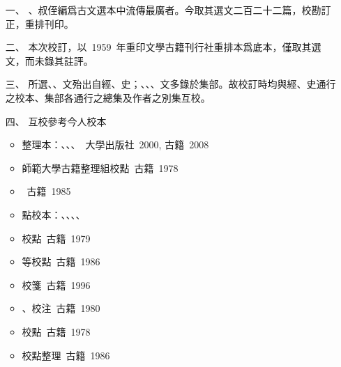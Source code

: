 \begin{enumerate}
    \item[一、] 、叔侄編爲古文選本中流傳最廣者。今取其選文二百二十二篇，校勘訂正，重排刊印。
    \item[二、] 本次校訂，以\ 1959\ 年重印文學古籍刊行社重排本爲底本，僅取其選文，而未錄其註評。
    \item[三、] 所選、、文殆出自經、史；、、、文多錄於集部。故校訂時均與經、史通行之校本、集部各通行之總集及作者之別集互校。
    \item[四、] 互校參考今人校本
    \begin{itemize}
        \item {}整理本：、、、\ {\small {}大學出版社\ 2000, 古籍\ 2008}
        \item {}師範大學古籍整理組校點\ {\small {}古籍\ 1978}
        \item {}\ {\small {}古籍\ 1985}
        \item {}點校本：、、、、
        \item {}校點\ {\small {}古籍\ 1979}
        \item {}等校點\ {\small {}古籍\ 1986}
        \item {}校箋\ {\small {}古籍\ 1996}
        \item {}、校注\ {\small {}古籍\ 1980}
        \item {}校點\ {\small {}古籍\ 1978}
        \item {}校點整理\ {\small {}古籍\ 1986}

\end{itemize}
\end{enumerate}
